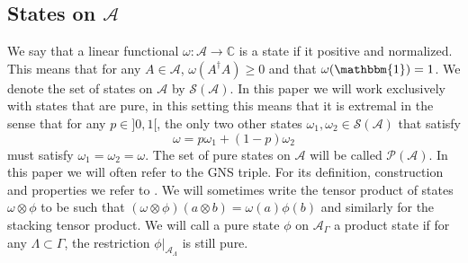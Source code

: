 \documentclass[12pt,a4paper,twoside]{article}
\newcommand{\PP}{\mathcal P}
\newcommand{\CC}{\mathbb C}
\renewcommand{\AA}{\mathcal A}
\newcommand{\id}{\mathbbm{1}}
\theoremstyle{definition}
\numberwithin{equation}{section}
\begin{document}
\subsection{States on $\AA$}
We say that a linear functional $\omega:\AA\rightarrow \CC$ is a state if it positive and normalized. This means that for any $A\in\AA$, $\omega(A^\dagger A)\geq 0$ and that $\omega(\id)=1$. We denote the set of states on $\AA$ by $\mathcal{S}(\AA)$. In this paper we will work exclusively with states that are pure, in this setting this means that it is extremal in the sense that for any $p\in]0,1[$, the only two other states $\omega_1,\omega_2\in\mathcal{S}(\AA)$ that satisfy
\begin{equation}
	\omega=p\omega_1+(1-p)\omega_2
\end{equation}
must satisfy $\omega_1=\omega_2=\omega$. The set of pure states on $\AA$ will be called $\PP(\AA)$. In this paper we will often refer to the GNS triple. For its definition, construction and properties we refer to \cite{bratteli1979operator}. We will sometimes write the tensor product of states $\omega\otimes\phi$ to be such that $(\omega\otimes\phi)(a\otimes b)=\omega(a)\phi(b)$ and similarly for the stacking tensor product. We will call a pure state $\phi$ on $\AA_\Gamma$ a product state if for any $\Lambda\subset\Gamma$, the restriction $\phi|_{\AA_\Lambda}$ is still pure.
\end{document}
